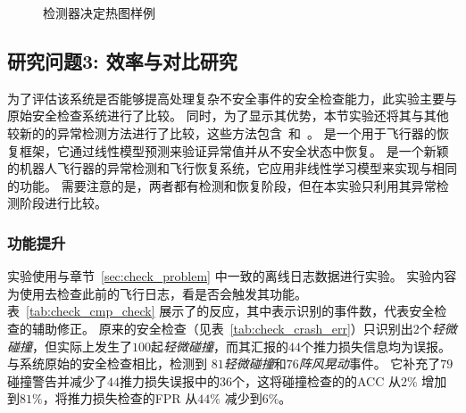 \begin{figure}[htb]
\caption{检测器决定热图样例} 
\end{figure}



\subsection{研究问题3: 效率与对比研究}
为了评估该系统是否能够提高处理复杂不安全事件的安全检查能力，此实验主要与原始安全检查系统进行了比较。
同时，为了显示其优势，本节实验还将其与其他较新的的异常检测方法进行了比较，这些方法包含~\cite{choi2020software}和~\cite{piper}。
是一个用于飞行器的恢复框架，它通过线性模型预测来验证异常值并从不安全状态中恢复。
是一个新颖的机器人飞行器的异常检测和飞行恢复系统，它应用非线性学习模型来实现与相同的功能。
需要注意的是，两者都有检测和恢复阶段，但在本实验只利用其异常检测阶段进行比较。

\subsubsection{功能提升}
实验使用与章节~\ref{sec:check_problem} 中一致的离线日志数据进行实验。
实验内容为使用\deccheck 去检查此前的飞行日志，看是否会触发其功能。
表~\ref{tab:check_cmp_check} 展示了\deccheck 的反应，其中表示\deccheck 识别的事件数，代表安全检查的辅助修正。
原来的安全检查（见表~\ref{tab:check_crash_err}）只识别出$2$个\emph{轻微碰撞}，但实际上发生了$100$起\emph{轻微碰撞}，而其汇报的$44$个推力损失信息均为误报。
与系统原始的安全检查相比，\deccheck 检测到 $81$\emph{轻微碰撞}和$76$\emph{阵风晃动}事件。
它补充了$79$ 碰撞警告并减少了$44$推力损失误报中的$36$个，这将碰撞检查的的ACC 从$2\%$ 增加到$81\%$，将推力损失检查的FPR 从$44\%$ 减少到$6\%$。

